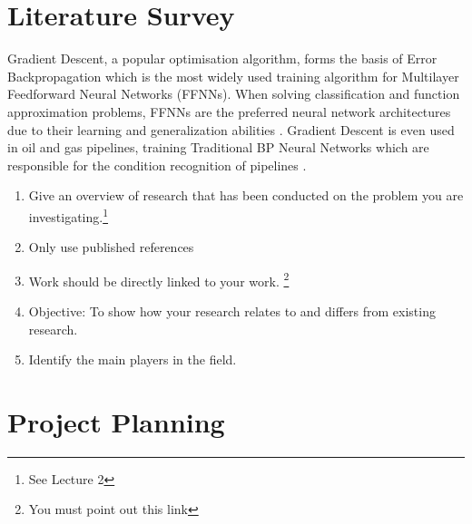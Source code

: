 \documentclass[runningheads,a4paper]{llncs}
\begin{document}
\section{Literature Survey}

Gradient Descent, a popular optimisation algorithm, forms the basis of Error Backpropagation which is 
the most widely used training algorithm for Multilayer Feedforward Neural Networks (FFNNs). 
When solving classification and function approximation problems, FFNNs are the preferred neural network architectures 
due to their learning and generalization abilities \cite{gong2012training}. Gradient Descent is even used in oil and gas pipelines, 
training Traditional BP Neural Networks which are responsible for the condition recognition of pipelines \cite{laibin2009novel}.

\begin{enumerate}
 \item Give an overview of research that has been conducted on the problem you are investigating.\footnote{See Lecture 2}
 \item Only use published references
 \item Work should be directly linked to your work. \footnote{You must point out this link}
 \item Objective: To show how your research relates to and differs from existing research.
 \item Identify the main players in the field.
\end{enumerate}


\section{Project Planning}
\end{document}

